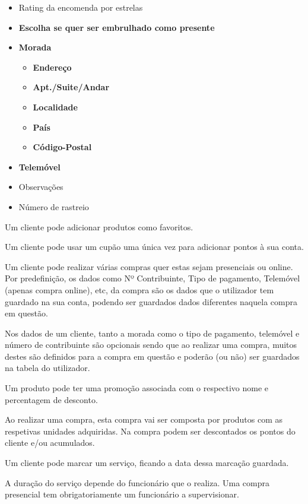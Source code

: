 \documentclass[10pt,portuguese]{article}
\begin{document}
\begin{itemize}
    \item Rating da encomenda por estrelas
    \item \textbf{Escolha se quer ser embrulhado como presente}
    \item \textbf{Morada}
    \begin{itemize}
        \item \textbf{Endereço}
        \item \textbf{Apt./Suite/Andar}
        \item \textbf{Localidade}
        \item \textbf{País}
        \item \textbf{Código-Postal}
    \end{itemize}
    \item \textbf{Telemóvel} 
    \item Observações
    \item Número de rastreio
\end{itemize}

\par Um cliente pode adicionar produtos como favoritos.
\par Um cliente pode usar um cupão uma única vez para adicionar pontos à sua conta.
\par Um cliente pode realizar várias compras quer estas sejam presenciais ou online. Por predefinição, os dados como Nº Contribuinte, Tipo de pagamento, Telemóvel (apenas compra online), etc, da compra são os dados que o utilizador tem guardado na sua conta, podendo ser guardados dados diferentes naquela compra em questão.
\par Nos dados de um cliente, tanto a morada como o tipo de pagamento, telemóvel e número de contribuinte são opcionais sendo que ao realizar uma compra, muitos destes são definidos para a compra em questão e poderão (ou não) ser guardados na tabela do utilizador.
\par Um produto pode ter uma promoção associada com o respectivo nome e percentagem de desconto.
\par Ao realizar uma compra, esta compra vai ser composta por produtos com as respetivas unidades adquiridas. Na compra podem ser descontados os pontos do cliente e/ou acumulados.
\par Um cliente pode marcar um serviço, ficando a data dessa marcação guardada.
\par A duração do serviço depende do funcionário que o realiza.
Uma compra presencial tem obrigatoriamente um funcionário a supervisionar.
\end{document}
